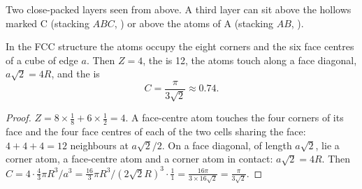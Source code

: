\begin{omfigure}

{\small Two close-packed layers seen from above. A third layer can sit
above the hollows marked C (stacking $ABC$, ) or above
the atoms of A (stacking $AB$, ).}
\end{omfigure}

\begin{proposition}\label{prop:b1:crystals-metals:fcc}
In the FCC structure the atoms occupy the eight corners and the six face
centres of a cube of edge $a$. Then $Z = 4$, the  is
12, the atoms touch along a face diagonal, $a\sqrt2 = 4R$, and the
 is
\[
  C = \frac{\pi}{3\sqrt2} \approx 0.74 .
\]
\end{proposition}

\begin{proof}
$Z = 8 \times \frac18 + 6 \times \frac12 = 4$. A face-centre atom touches
the four corners of its face and the four face centres of each of the two
cells sharing the face: $4 + 4 + 4 = 12$ neighbours at $a\sqrt2/2$. On a
face diagonal, of length $a\sqrt2$, lie a corner atom, a face-centre atom
and a corner atom in contact: $a\sqrt2 = 4R$. Then
$C = 4 \cdot \frac43\pi R^3/a^3 = \frac{16}{3}\pi R^3/(2\sqrt2 R)^3 \cdot
\frac{1}{1} = \frac{16\pi}{3 \times 16\sqrt2} = \frac{\pi}{3\sqrt2}$.
\end{proof}

